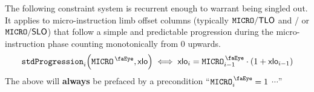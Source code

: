 The following constraint system is recurrent enough to warrant being singled out.
It applies to micro-instruction limb offset columns (typically $\texttt{MICRO}\textsf{/}{\textsf{\textsf{TLO}}}$ and / or $\texttt{MICRO}\textsf{/}{\textsf{\textsf{SLO}}}$) that follow a simple and predictable progression during the micro-instruction phase counting monotonically from $0$ upwards.
\[
	\stdProgression_{i} \Big( \isMicro, \col{xlo} \Big)
	\iff
	\col{xlo}_{i} =
	\isMicro_{i - 1}
	\cdot (1 + \col{xlo}_{i - 1})
\]
\saNote{} The above will \textbf{always} be prefaced by a precondition ``\If $\isMicro_{i} = 1$ \Then $\cdots$''
